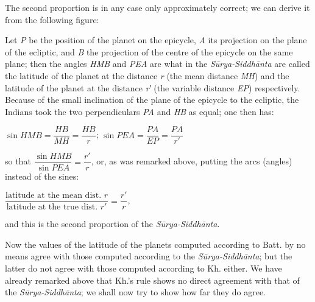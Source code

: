 \documentclass[11pt]{article}
\newcommand{\Pg}[1]{\marginpar{\footnotesize\color{gray}#1}}
\begin{document}
\par The second proportion is in any case only approximately correct; we can derive it from the following figure:\par
\par Let \emph{P} be the position of the planet on the epicycle, \emph{A} its projection on the plane of the ecliptic, and \emph{B} the projection of the centre of the epicycle on the same plane; then the angles \emph{HMB} and \emph{PEA} are what in the \emph{Sūrya-Siddhānta} are called the latitude of the planet at the distance \emph{r} (the mean distance \emph{MH}) and the latitude of the planet at the distance \emph{r′} (the variable distance \emph{EP}) respectively. Because of the small inclination of the plane of the epicycle to the ecliptic, the Indians took the two perpendiculars \emph{PA} and \emph{HB} as equal; one then has:\par
\par\begin{center}$\sin HMB = \dfrac{HB}{MH} = \dfrac{HB}{r}$; $\sin PEA = \dfrac{PA}{EP} = \dfrac{PA}{r'}$\end{center}
\par so that $\dfrac{\sin HMB}{\sin PEA} = \dfrac{r'}{r}$, \Pg{62}or, as was remarked above, putting the arcs (angles) instead of the sines:\par
\par\begin{center}$\dfrac{\text{latitude at the mean dist. } r}{\text{latitude at the true dist. } r'} = \dfrac{r'}{r}$,\end{center}
\par and this is the second proportion of the \emph{Sūrya-Siddhānta}.\par
\par Now the values of the latitude of the planets computed according to Batt. by no means agree with those computed according to the \emph{Sūrya-Siddhānta}; but the latter do not agree with those computed according to Kh. either. We have already remarked above that Kh.'s rule shows no direct agreement with that of the \emph{Sūrya-Siddhānta}; we shall now try to show how far they do agree.\par
\end{document}
